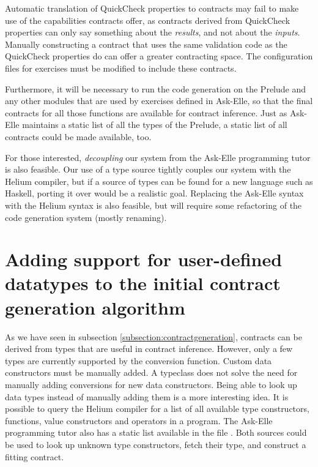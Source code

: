 \documentclass[10pt]{report}
\newcommand{\code}[1]{%
  {%
   \setlength{\fboxsep}{-2\fboxrule}%
   \fcolorbox{black}{light-gray}{\hspace{1.5pt}\strut\texttt{#1}\hspace{1.5pt}}%
  }%
}
\begin{document}
{Automatic translation of QuickCheck properties to contracts may fail to make use of the capabilities contracts offer, as contracts derived from QuickCheck properties can only say something about the \textit{results}, and not about the \textit{inputs}.
Manually constructing a contract that uses the same validation code as the QuickCheck properties do can offer a greater contracting space.
The configuration files for exercises must be modified to include these contracts.

Furthermore, it will be necessary to run the code generation on the Prelude and any other modules that are used by exercises defined in Ask-Elle, so that the final contracts for all those functions are available for contract inference.
Just as Ask-Elle maintains a static list of all the types of the Prelude, a static list of all contracts could be made available, too.

For those interested, \textit{decoupling} our system from the Ask-Elle programming tutor is also feasible.
Our use of a type source tightly couples our system with the Helium compiler, but if a source of types can be found for a new language such as Haskell, porting it over would be a realistic goal.
Replacing the Ask-Elle syntax with the Helium syntax is also feasible, but will require some refactoring of the code generation system (mostly renaming).

\section{Adding support for user-defined datatypes to the initial contract generation algorithm}
\label{datatype-support-initial-contracts-algorithm}

As we have seen in subsection \ref{subsection:contractgeneration}, contracts can be derived from types that are useful in contract inference.
However, only a few types are currently supported by the conversion function.
Custom data constructors must be manually added.
A typeclass does not solve the need for manually adding conversions for new data constructors. 
Being able to look up data types instead of manually adding them is a more interesting idea.
It is possible to query the Helium compiler for a list of all available type constructors, functions, value constructors and operators in a program.
The Ask-Elle programming tutor also has a static list available in the file \code{Domain\textbackslash FP\textbackslash HeliumImportEnvs.hs}.
Both sources could be used to look up unknown type constructors, fetch their type, and construct a fitting contract.

}
\end{document}
